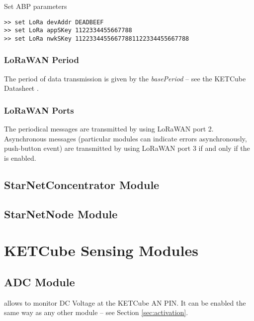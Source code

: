 \begin{docCodeExampleTitled}{Set ABP parameters}
\begin{verbatim}
>> set LoRa devAddr DEADBEEF
>> set LoRa appSKey 1122334455667788
>> set LoRa nwkSKey 11223344556677881122334455667788
\end{verbatim}
\end{docCodeExampleTitled}

\subsubsection{LoRaWAN Period}
The period of data transmission is given by the {\it basePeriod} -- see the KETCube Datasheet \cite{ZCU:KETCube:05-2018}.

\subsubsection{LoRaWAN Ports}

  The periodical messages are transmitted by using LoRaWAN port 2. Asynchronous messages (particular modules can indicate errors asynchronously, push-button event) are transmitted by using LoRaWAN port 3 if and only if the  is enabled.

\clearpage
\subsection{StarNetConcentrator Module}


\clearpage
\subsection{StarNetNode Module}



\clearpage
\section{KETCube Sensing Modules}

\subsection{ADC Module}
 allows to monitor DC Voltage at the KETCube AN PIN. It can be enabled the same way as any other module -- see Section \ref{sec:activation}.

